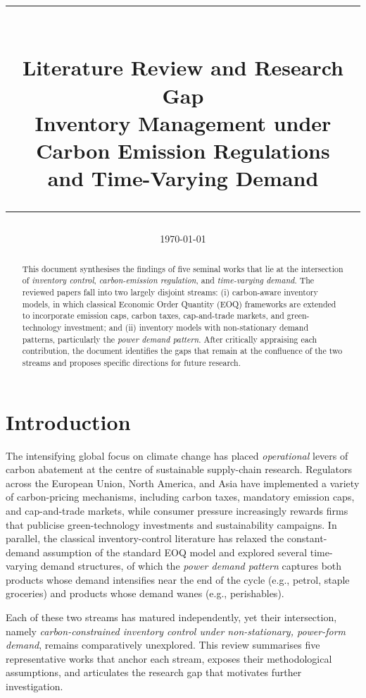 \documentclass[11pt,a4paper]{article}
\title{
  \vspace{-1.5cm}
  \rule{\linewidth}{0.4pt}\\[0.4em]
  {\Huge\bfseries Literature Review and Research Gap}\\[0.3em]
  {\Large Inventory Management under Carbon Emission Regulations \\ and Time-Varying Demand}\\[0.4em]
  \rule{\linewidth}{0.4pt}
}
\author{}
\date{\today}
\begin{document}
\maketitle
\thispagestyle{empty}

\begin{abstract}
\noindent
This document synthesises the findings of five seminal works that lie at the
intersection of \emph{inventory control}, \emph{carbon-emission regulation}, and
\emph{time-varying demand}. The reviewed papers fall into two largely
disjoint streams: (i) carbon-aware inventory models, in which classical
Economic Order Quantity (EOQ) frameworks are extended to incorporate
emission caps, carbon taxes, cap-and-trade markets, and green-technology
investment; and (ii) inventory models with non-stationary
demand patterns, particularly the \emph{power demand pattern}. After
critically appraising each contribution, the document identifies the gaps
that remain at the confluence of the two streams and proposes specific
directions for future research.
\end{abstract}

\vspace{0.3em}

\section{Introduction}

The intensifying global focus on climate change has placed
\emph{operational} levers of carbon abatement at the centre of
sustainable supply-chain research. Regulators across the European Union,
North America, and Asia have implemented a variety of carbon-pricing
mechanisms, including carbon taxes, mandatory emission caps, and
cap-and-trade markets, while consumer pressure increasingly rewards firms
that publicise green-technology investments and sustainability
campaigns. In parallel, the classical inventory-control literature has
relaxed the constant-demand assumption of the standard EOQ model and
explored several time-varying demand structures, of which the
\emph{power demand pattern} captures both products whose demand
intensifies near the end of the cycle (e.g., petrol, staple
groceries) and products whose demand wanes (e.g., perishables).

Each of these two streams has matured independently, yet their
intersection, namely \emph{carbon-constrained inventory control under
non-stationary, power-form demand}, remains comparatively unexplored.
This review summarises five representative works that anchor each
stream, exposes their methodological assumptions, and articulates the
research gap that motivates further investigation.
\end{document}
